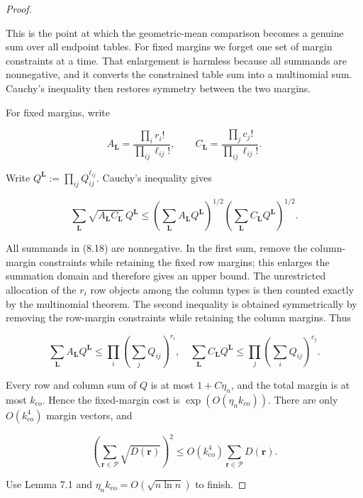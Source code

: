 \documentclass[11pt,reqno]{amsart}
\begin{document}
\begin{proof}\label{proof-6}

This is the point at which the geometric-mean comparison becomes a genuine
sum over all endpoint tables.  For fixed margins we forget one set of margin
constraints at a time.  That enlargement is harmless because all summands are
nonnegative, and it converts the constrained table sum into a multinomial
sum.  Cauchy's inequality then restores symmetry between the two margins.

For fixed margins, write

\[
 A_{\mathbf L}=\frac{\prod_i r_i!}{\prod_{ij}\ell_{ij}!},\qquad
 C_{\mathbf L}=\frac{\prod_j c_j!}{\prod_{ij}\ell_{ij}!}.        \tag{8.17}
\]

Write \(Q^{\mathbf L}:=\prod_{ij}Q_{ij}^{\ell_{ij}}\).
Cauchy's inequality gives

\[
 \sum_{\mathbf L}\sqrt{A_{\mathbf L}C_{\mathbf L}}\,Q^{\mathbf L}
 \le\left(\sum_{\mathbf L}A_{\mathbf L}Q^{\mathbf L}\right)^{1/2}
      \left(\sum_{\mathbf L}C_{\mathbf L}Q^{\mathbf L}\right)^{1/2}.
                                                               \tag{8.18}
\]

All summands in (8.18) are nonnegative. In the first sum, remove the
column-margin constraints while retaining the fixed row margins; this
enlarges the summation domain and therefore gives an upper bound. The
unrestricted allocation of the \(r_i\) row objects among the column types is
then counted exactly by the multinomial theorem. The second inequality is
obtained symmetrically by removing the row-margin constraints while
retaining the column margins. Thus

\[
 \sum_{\mathbf L}A_{\mathbf L}Q^{\mathbf L}
 \le\prod_i\left(\sum_jQ_{ij}\right)^{r_i},
 \quad
 \sum_{\mathbf L}C_{\mathbf L}Q^{\mathbf L}
 \le\prod_j\left(\sum_iQ_{ij}\right)^{c_j}.
                                                               \tag{8.19}
\]

Every row and column sum of \(Q\) is at most \(1+C \eta_n\),
and the total margin is at most \(k_{\mathrm{co}}\). Hence the fixed-margin
cost is
\(\exp(O(\eta_n k_{\mathrm{co}}))\).
There are only \(O(k_{\mathrm{co}}^4)\) margin vectors, and

\[
  \left(\sum_{\mathbf r\in\mathcal P}\sqrt{D(\mathbf r)}\right)^2
  \le O(k_{\mathrm{co}}^4)\sum_{\mathbf r\in\mathcal P}D(\mathbf r).
                                                               \tag{8.20}
\]

Use Lemma 7.1 and
\(\eta_n k_{\mathrm{co}}=O(\sqrt{n{\ln n}})\)
to finish.
\end{proof}
\end{document}
